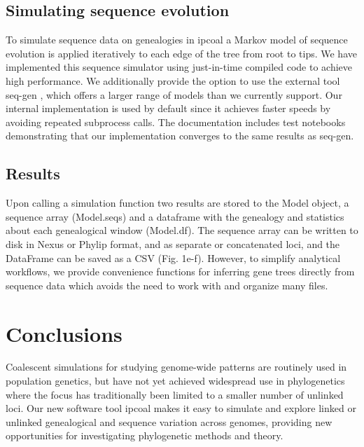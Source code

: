 \documentclass[11pt]{article}
\begin{document}
\subsection{Simulating sequence evolution}
To simulate sequence data on genealogies in ipcoal a Markov model of sequence evolution is applied iteratively to each edge of the tree from root to tips. We have implemented this sequence simulator using just-in-time compiled code to achieve high performance. We additionally provide the option to use the external tool seq-gen \cite{rambaut_seqgen_1997}, which offers a larger range of models than we currently support. Our internal implementation is used by default since it achieves faster speeds by avoiding repeated subprocess calls. The documentation includes test notebooks demonstrating that our implementation converges to the same results as seq-gen.

\subsection{Results}
Upon calling a simulation function two results are stored to the Model object, a sequence array (Model.seqs) and a dataframe with the genealogy and statistics about each genealogical window (Model.df). The sequence array can be written to disk in Nexus or Phylip format, and as separate or concatenated loci, and the DataFrame can be saved as a CSV (Fig. 1e-f). However, to simplify analytical workflows, we provide convenience functions for inferring gene trees directly from sequence data which avoids the need to work with and organize many files.

\section{Conclusions}
\label{sec:conclusions}
Coalescent simulations for studying genome-wide patterns are routinely used in population genetics, but have not yet achieved widespread use in phylogenetics where the focus has traditionally been limited to a smaller number of unlinked loci. Our new software tool ipcoal makes it easy to simulate and explore linked or unlinked genealogical and sequence variation across genomes, providing new opportunities for investigating phylogenetic methods and theory.
\end{document}
